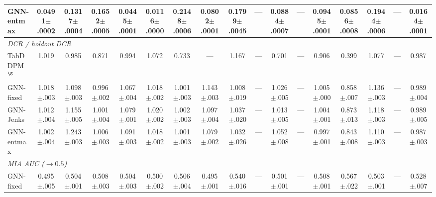 \begin{table}[t]
{\begin{tabular}{lcccccccccccccccc}
GNN-entmax & 0.0491{\scriptsize$\pm$.0002} & 0.1317{\scriptsize$\pm$.0004} & 0.1652{\scriptsize$\pm$.0005} & 0.0445{\scriptsize$\pm$.0001} & 0.0116{\scriptsize$\pm$.0000} & 0.2148{\scriptsize$\pm$.0006} & 0.0802{\scriptsize$\pm$.0001} & 0.1799{\scriptsize$\pm$.0045} & --- & 0.0884{\scriptsize$\pm$.0007} & --- & 0.0945{\scriptsize$\pm$.0001} & 0.0856{\scriptsize$\pm$.0008} & 0.1944{\scriptsize$\pm$.0006} & --- & 0.0164{\scriptsize$\pm$.0001} \\
\midrule
\multicolumn{17}{l}{\textit{DCR / holdout DCR}} \\
TabDDPM$^\S$ & 1.019 & 0.985 & 0.871 & 0.994 & 1.072 & 0.733 & --- & 1.167 & --- & 0.701 & --- & 0.906 & 0.399 & 1.077 & --- & 0.987 \\
GNN-fixed & 1.018{\scriptsize$\pm$.003} & 1.098{\scriptsize$\pm$.003} & 0.996{\scriptsize$\pm$.002} & 1.067{\scriptsize$\pm$.004} & 1.018{\scriptsize$\pm$.002} & 1.001{\scriptsize$\pm$.003} & 1.143{\scriptsize$\pm$.003} & 1.008{\scriptsize$\pm$.019} & --- & 1.026{\scriptsize$\pm$.005} & --- & 1.005{\scriptsize$\pm$.000} & 0.858{\scriptsize$\pm$.007} & 1.136{\scriptsize$\pm$.003} & --- & 0.989{\scriptsize$\pm$.004} \\
GNN-Jenks & 1.012{\scriptsize$\pm$.004} & 1.155{\scriptsize$\pm$.005} & 1.001{\scriptsize$\pm$.004} & 1.079{\scriptsize$\pm$.001} & 1.020{\scriptsize$\pm$.002} & 1.002{\scriptsize$\pm$.003} & 1.097{\scriptsize$\pm$.004} & 1.037{\scriptsize$\pm$.020} & --- & 1.013{\scriptsize$\pm$.005} & --- & 1.004{\scriptsize$\pm$.001} & 0.873{\scriptsize$\pm$.013} & 1.118{\scriptsize$\pm$.003} & --- & 0.989{\scriptsize$\pm$.005} \\
GNN-entmax & 1.002{\scriptsize$\pm$.004} & 1.243{\scriptsize$\pm$.003} & 1.006{\scriptsize$\pm$.003} & 1.091{\scriptsize$\pm$.003} & 1.018{\scriptsize$\pm$.002} & 1.001{\scriptsize$\pm$.003} & 1.079{\scriptsize$\pm$.002} & 1.032{\scriptsize$\pm$.026} & --- & 1.052{\scriptsize$\pm$.008} & --- & 0.997{\scriptsize$\pm$.001} & 0.843{\scriptsize$\pm$.008} & 1.110{\scriptsize$\pm$.003} & --- & 0.987{\scriptsize$\pm$.003} \\
\midrule
\multicolumn{17}{l}{\textit{MIA AUC ($\to 0.5$)}} \\
GNN-fixed & 0.495{\scriptsize$\pm$.005} & 0.504{\scriptsize$\pm$.001} & 0.508{\scriptsize$\pm$.003} & 0.504{\scriptsize$\pm$.003} & 0.500{\scriptsize$\pm$.002} & 0.506{\scriptsize$\pm$.004} & 0.495{\scriptsize$\pm$.001} & 0.540{\scriptsize$\pm$.016} & --- & 0.501{\scriptsize$\pm$.001} & --- & 0.508{\scriptsize$\pm$.001} & 0.567{\scriptsize$\pm$.022} & 0.503{\scriptsize$\pm$.001} & --- & 0.528{\scriptsize$\pm$.007} \\

\end{tabular}}
\end{table}
